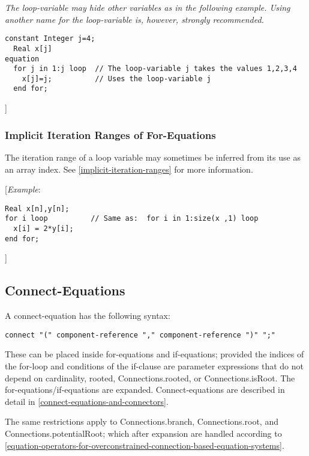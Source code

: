 \emph{The loop-variable may hide other variables as in the following
example. Using another name for the loop-variable is, however, strongly
recommended.}

\begin{lstlisting}[language=modelica]
  constant Integer j=4;
  Real x[j]
equation
  for j in 1:j loop  // The loop-variable j takes the values 1,2,3,4
    x[j]=j;          // Uses the loop-variable j
  end for;
\end{lstlisting}
{]}


\subsubsection{Implicit Iteration Ranges of For-Equations}

The iteration range of a loop variable may sometimes be inferred from
its use as an array index. See \autoref{implicit-iteration-ranges} for more information.

{[}\emph{Example}:
\begin{lstlisting}[language=modelica]
  Real x[n],y[n];
for i loop          // Same as:  for i in 1:size(x ,1) loop
  x[i] = 2*y[i];
end for;
\end{lstlisting}
{]}

\subsection{Connect-Equations}

A connect-equation has the following syntax:
\begin{lstlisting}[language=grammar]
connect "(" component-reference "," component-reference ")" ";"
\end{lstlisting}

These can be placed inside for-equations and if-equations; provided the
indices of the for-loop and conditions of the if-clause are parameter
expressions that do not depend on cardinality, rooted,
Connections.rooted, or Connections.isRoot. The
for-equations/if-equations are expanded. Connect-equations are described
in detail in \autoref{connect-equations-and-connectors}.

The same restrictions apply to Connections\allowbreak{}.branch, Connections\allowbreak{}.root, and
Connections\allowbreak{}.potentialRoot; which after expansion are handled according
to \autoref{equation-operators-for-overconstrained-connection-based-equation-systems}.

